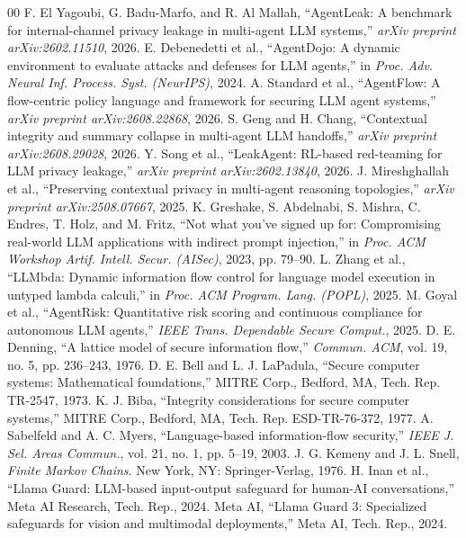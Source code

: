 \documentclass[conference]{IEEEtran}
\begin{document}
\balance
\begin{thebibliography}{00}
 F. El Yagoubi, G. Badu-Marfo, and R. Al Mallah, ``AgentLeak: A benchmark for internal-channel privacy leakage in multi-agent LLM systems,'' \emph{arXiv preprint arXiv:2602.11510}, 2026.
 E. Debenedetti et al., ``AgentDojo: A dynamic environment to evaluate attacks and defenses for LLM agents,'' in \emph{Proc. Adv. Neural Inf. Process. Syst. (NeurIPS)}, 2024.
 A. Standard et al., ``AgentFlow: A flow-centric policy language and framework for securing LLM agent systems,'' \emph{arXiv preprint arXiv:2608.22868}, 2026.
 S. Geng and H. Chang, ``Contextual integrity and summary collapse in multi-agent LLM handoffs,'' \emph{arXiv preprint arXiv:2608.29028}, 2026.
 Y. Song et al., ``LeakAgent: RL-based red-teaming for LLM privacy leakage,'' \emph{arXiv preprint arXiv:2602.13840}, 2026.
 J. Mireshghallah et al., ``Preserving contextual privacy in multi-agent reasoning topologies,'' \emph{arXiv preprint arXiv:2508.07667}, 2025.
 K. Greshake, S. Abdelnabi, S. Mishra, C. Endres, T. Holz, and M. Fritz, ``Not what you've signed up for: Compromising real-world LLM applications with indirect prompt injection,'' in \emph{Proc. ACM Workshop Artif. Intell. Secur. (AISec)}, 2023, pp. 79--90.
 L. Zhang et al., ``LLMbda: Dynamic information flow control for language model execution in untyped lambda calculi,'' in \emph{Proc. ACM Program. Lang. (POPL)}, 2025.
 M. Goyal et al., ``AgentRisk: Quantitative risk scoring and continuous compliance for autonomous LLM agents,'' \emph{IEEE Trans. Dependable Secure Comput.}, 2025.
 D. E. Denning, ``A lattice model of secure information flow,'' \emph{Commun. ACM}, vol. 19, no. 5, pp. 236--243, 1976.
 D. E. Bell and L. J. LaPadula, ``Secure computer systems: Mathematical foundations,'' MITRE Corp., Bedford, MA, Tech. Rep. TR-2547, 1973.
 K. J. Biba, ``Integrity considerations for secure computer systems,'' MITRE Corp., Bedford, MA, Tech. Rep. ESD-TR-76-372, 1977.
 A. Sabelfeld and A. C. Myers, ``Language-based information-flow security,'' \emph{IEEE J. Sel. Areas Commun.}, vol. 21, no. 1, pp. 5--19, 2003.
 J. G. Kemeny and J. L. Snell, \emph{Finite Markov Chains}. New York, NY: Springer-Verlag, 1976.
 H. Inan et al., ``Llama Guard: LLM-based input-output safeguard for human-AI conversations,'' Meta AI Research, Tech. Rep., 2024.
 Meta AI, ``Llama Guard 3: Specialized safeguards for vision and multimodal deployments,'' Meta AI, Tech. Rep., 2024.

\end{thebibliography}
\end{document}
